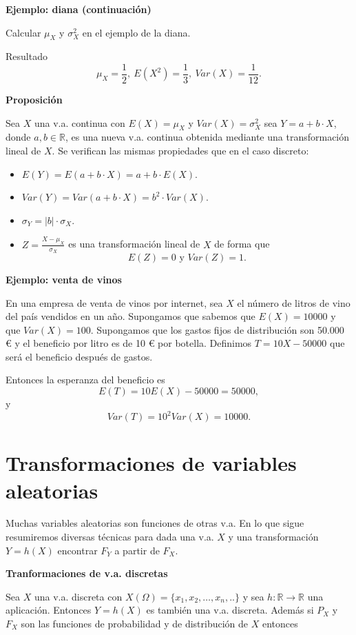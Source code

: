 \documentclass[
  letterpaper,
  DIV=11,
  numbers=noendperiod]{scrreprt}
\providecommand{\tightlist}{%
  \setlength{\itemsep}{0pt}\setlength{\parskip}{0pt}}\usepackage{longtable,booktabs,array}
\begin{document}
\textbf{Ejemplo: diana (continuación)}

Calcular \(\mu_{X}\) y \(\sigma_{X}^2\) en el ejemplo de la diana.

Resultado \[\mu_{X}=\frac12,\ E(X^2)=\frac13,\ Var(X)=\frac1{12}.\]

\textbf{Proposición}

Sea \(X\) una v.a. continua con \(E(X)=\mu_{X}\) y
\(Var(X)=\sigma_{X}^2\) sea \(Y=a+b\cdot X\), donde
\(a,b\in\mathbb{R}\), es una nueva v.a. continua obtenida mediante una
transformación lineal de \(X\). Se verifican las mismas propiedades que
en el caso discreto:

\begin{itemize}
\tightlist
\item
  \(E(Y)=E(a+b\cdot X)=a+b\cdot E(X)\).
\item
  \(Var(Y)=Var(a+b\cdot X)=b^2\cdot Var(X)\).
\item
  \(\sigma_{Y}=|b|\cdot \sigma_{X}\).
\item
  \(Z=\frac{X-\mu_{X}}{\sigma_{X}}\) es una transformación lineal de
  \(X\) de forma que \[E(Z)=0 \mbox{ y } Var(Z)=1.\]
\end{itemize}

\textbf{Ejemplo: venta de vinos}

En una empresa de venta de vinos por internet, sea \(X\) el número de
litros de vino del país vendidos en un año. Supongamos que sabemos que
\(E(X)=10000\) y que \(Var(X)=100\). Supongamos que los gastos fijos de
distribución son 50.000 € y el beneficio por litro es de 10 € por
botella. Definimos \(T=10 X-50000\) que será el beneficio después de
gastos.

Entonces la esperanza del beneficio es \[E(T)=10 E(X)-50000 = 50000,\] y
\[Var(T)=10^2 Var(X)= 10000.\]

\hypertarget{transformaciones-de-variables-aleatorias}{%
\section{Transformaciones de variables
aleatorias}\label{transformaciones-de-variables-aleatorias}}

Muchas variables aleatorias son funciones de otras v.a. En lo que sigue
resumiremos diversas técnicas para dada una v.a. \(X\) y una
transformación \(Y=h(X)\) encontrar \(F_{Y}\) a partir de \(F_{X}\).

\textbf{Tranformaciones de v.a. discretas}

Sea \(X\) una v.a. discreta con
\(X(\Omega)=\{x_1,x_2,\ldots,x_{n},..\}\) y sea
\(h:\mathbb{R}\to\mathbb{R}\) una aplicación. Entonces \(Y=h(X)\) es
también una v.a. discreta. Además si \(P_X\) y \(F_{X}\) son las
funciones de probabilidad y de distribución de \(X\) entonces
\end{document}
